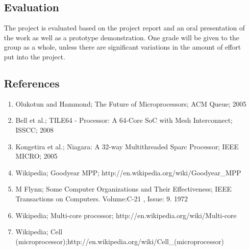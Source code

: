 \subsection{Evaluation}
The project is evaluated based on the project report and an oral presentation of
the work as well as a prototype demonstration. One grade will be given to the
group as a whole, unless there are significant variations in the amount of
effort put into the project.

\subsection{References}

\begin{enumerate}
	\item Olukotun and Hammond; The Future of Microprocessors; ACM Queue; 2005
\item Bell et al.; TILE64 - Processor: A 64-Core SoC with Mesh Interconnect; ISSCC; 2008
\item Kongetira et al.; Niagara: A 32-way Multithreaded Sparc Processor; IEEE MICRO; 2005
\item Wikipedia; Goodyear MPP; http://en.wikipedia.org/wiki/Goodyear\_MPP
\item M Flynn; Some Computer Organizations and Their Effectiveness; IEEE Transactions on Computers. Volume:C-21 , Issue: 9. 1972
\item Wikipedia; Multi-core processor; http://en.wikipedia.org/wiki/Multi-core
\item Wikipedia; Cell (microprocessor);http://en.wikipedia.org/wiki/Cell\_(microprocessor)
\end{enumerate}
